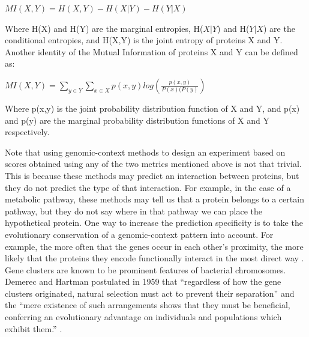 \documentclass{ucetd}
\begin{document}
\begin{center}
$MI(X,Y) = H(X,Y) - H(X|Y) - H(Y|X)$\\
\end{center}
Where H(X) and H(Y) are the marginal entropies, H($X|Y$) and H($Y|X$) are the conditional entropies, and H(X,Y) is the joint entropy of proteins X and Y. 
Another identity of the Mutual Information of proteins X and Y can be defined as:

\begin{center}
$MI(X,Y) = \sum\limits_{y\in Y}\sum\limits_{x\in X}p(x,y)log\left(\frac{p(x,y)}{P(x)(P(y)}\right)$

\end{center}
Where p(x,y) is the joint probability distribution function of X and Y, and p(x) and p(y) are the marginal probability distribution functions of X and  Y respectively. \newpage

Note that using genomic-context methods to design an experiment based on scores obtained using any of the two metrics mentioned above is not that trivial. This is because these methods may predict an interaction between proteins, but they do not predict the type of  that interaction. For example, in the case of a metabolic pathway, these methods may tell us that a protein belongs to a certain pathway, but they do not say where in that pathway we can place the hypothetical protein. 
One way to increase the prediction specificity is to take the evolutionary conservation of a genomic-context pattern into account. For example, the more often that the genes occur in each other's proximity, the more likely that the proteins they encode functionally interact in the most direct way \cite{4, 45}. 
Gene clusters are known to be prominent features of bacterial chromosomes. Demerec and Hartman postulated in 1959 that ``regardless of how the gene clusters originated, natural selection must act to prevent their separation'' and the ``mere existence of such arrangements shows that they must be beneficial, conferring an evolutionary advantage on individuals and populations which exhibit them.'' \cite{7}.
\end{document}
